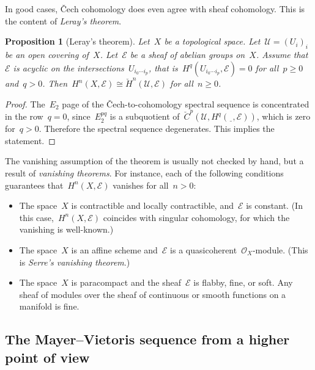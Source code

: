 \documentclass[10pt]{amsart}
\theoremstyle{definition}
\theoremstyle{plain}
\newtheorem{prop}[defn]{Proposition}
\theoremstyle{remark}
\newcommand{\E}{\mathcal{E}}
\renewcommand{\O}{\mathcal{O}}
\newcommand{\U}{\mathcal{U}}
\newcommand{\spot}{\underline{\ \ }}
\begin{document}
In good cases, Čech cohomology does even agree with sheaf cohomology. This is
the content of \emph{Leray's theorem}.

\begin{prop}[Leray's theorem]Let~$X$ be a topological space. Let~$\U = (U_i)_i$ be an open
covering of~$X$. Let~$\E$ be a sheaf of abelian groups
on~$X$. Assume that~$\E$ is acyclic on the intersections~$U_{i_0 \cdots i_p}$,
that is~$H^q(U_{i_0 \cdots i_p}, \E) = 0$ for all~$p \geq 0$ and~$q > 0$.
Then~$H^n(X,\E) \cong \check H^n(\U,\E)$ for all~$n \geq 0$.\end{prop}

\begin{proof}The~$E_2$ page of the Čech-to-cohomology spectral sequence is
concentrated in the row~$q = 0$, since~$E_2^{pq}$ is a subquotient of~$\check
C^p(\U, H^q(\spot,\E))$, which is zero for~$q > 0$. Therefore the spectral
sequence degenerates. This implies the statement.
\end{proof}

The vanishing assumption of the theorem is usually not checked by hand, but a
result of \emph{vanishing theorems}. For instance, each of the following
conditions guarantees that~$H^n(X,\E)$ vanishes for all~$n > 0$:
\begin{itemize}
\item The space~$X$ is contractible and locally contractible, and~$\E$ is
constant. (In this case,~$H^n(X,\E)$ coincides with singular cohomology, for
which the vanishing is well-known.)
\item The space~$X$ is an affine scheme and~$\E$ is a
quasicoherent~$\O_X$-module. (This is \emph{Serre's vanishing theorem}.)
\item The space~$X$ is paracompact and the sheaf~$\E$ is flabby, fine, or soft.
Any sheaf of modules over the sheaf of continuous or smooth functions on a
manifold is fine.
\end{itemize}


\subsection{The Mayer--Vietoris sequence from a higher point of view}
\end{document}
